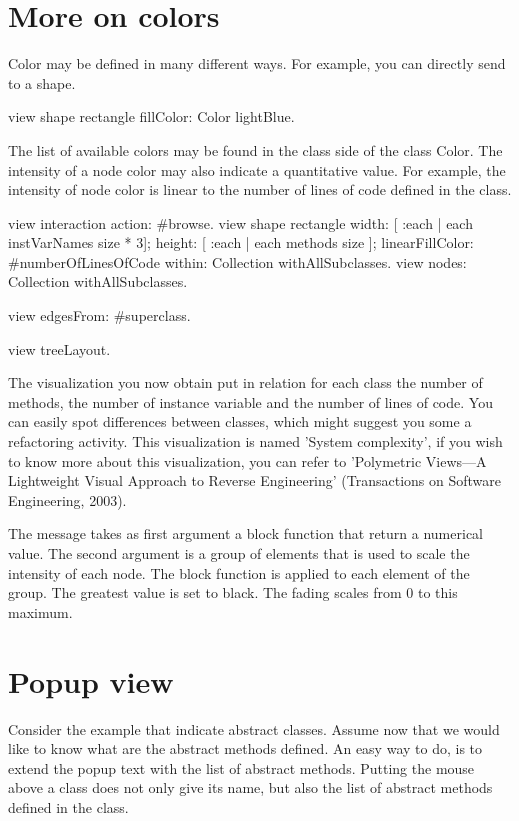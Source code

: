 \documentclass[a4paper,10pt,twoside]{book}
\begin{document}
\section{More on colors}
Color may be defined in many different ways. For example, you can directly send  to a shape.

\begin{code}{}
view shape rectangle
  fillColor: Color lightBlue.
\end{code}

The list of available colors may be found in the class side of the class Color. The intensity of a node color may also indicate a quantitative value. For example, the intensity of node color is linear to the number of lines of code defined in the class.

\begin{code}{}
view interaction action: #browse.
view shape rectangle
  width: [ :each | each instVarNames size * 3];
  height: [ :each | each methods size ];
  linearFillColor: #numberOfLinesOfCode within: Collection withAllSubclasses.
view nodes: Collection withAllSubclasses.

view edgesFrom: #superclass.

view treeLayout.
\end{code}

The visualization you now obtain put in relation for each class the number of methods, the number of instance variable and the number of lines of code. You can easily spot differences between classes, which might suggest you some a refactoring activity. This visualization is named 'System complexity', if you wish to know more about this visualization, you can refer to 'Polymetric Views---A Lightweight Visual Approach to Reverse Engineering' (Transactions on Software Engineering, 2003). 

The message  takes as first argument a block function that return a numerical value. The second argument is a group of elements that is used to scale the intensity of each node. The block function is applied to each element of the group. The greatest value is set to black. The fading scales from 0 to this maximum.

\section{Popup view}
Consider the example that indicate abstract classes. Assume now that we would like to know what are the abstract methods defined. An easy way to do, is to extend the popup text with the list of abstract methods. Putting the mouse above a class does not only give its name, but also the list of abstract methods defined in the class.
\end{document}

